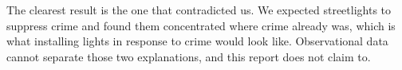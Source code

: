 \documentclass{report}
\begin{document}
The clearest result is the one that contradicted us. We expected streetlights to suppress crime and found them concentrated where crime already was, which is what installing lights in response to crime would look like. Observational data cannot separate those two explanations, and this report does not claim to.

\newpage
\nocite{*}
\printbibliography[heading=bibintoc]
\end{document}
